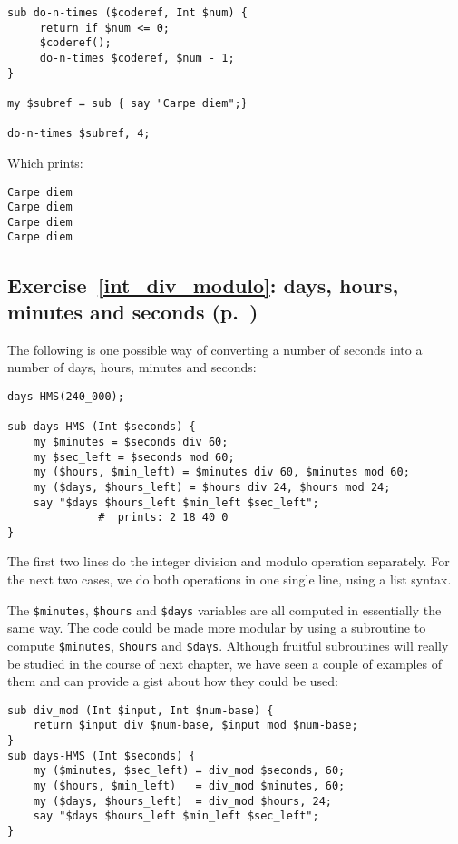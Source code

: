 \begin{verbatim}
sub do-n-times ($coderef, Int $num) {
     return if $num <= 0;
     $coderef();
     do-n-times $coderef, $num - 1;
}

my $subref = sub { say "Carpe diem";}

do-n-times $subref, 4;
\end{verbatim}

Which prints:

\begin{verbatim}
Carpe diem
Carpe diem
Carpe diem
Carpe diem
\end{verbatim}

\subsection{Exercise~\ref{int_div_modulo}: days, hours, 
minutes and seconds (p.~\pageref{int_div_modulo})}
\label{sol_int_div_modulo}

The following is one possible way of converting a number 
of seconds into a number of days, hours, minutes and seconds:


\begin{verbatim}
days-HMS(240_000);

sub days-HMS (Int $seconds) {
    my $minutes = $seconds div 60;
    my $sec_left = $seconds mod 60;
    my ($hours, $min_left) = $minutes div 60, $minutes mod 60;
    my ($days, $hours_left) = $hours div 24, $hours mod 24;
    say "$days $hours_left $min_left $sec_left"; 
              #  prints: 2 18 40 0
}
\end{verbatim}

The first two lines do the integer division and modulo 
operation separately. For the next two cases, we do both 
operations in one single line, using a list syntax.

The \verb'$minutes', \verb'$hours' and \verb'$days' variables 
are all computed in essentially the same way. The code could 
be made more modular by  using a subroutine to compute 
\verb'$minutes', \verb'$hours' and \verb'$days'. Although 
fruitful subroutines will really be studied in the course 
of next chapter, we have seen a couple of examples of 
them and can provide a gist about how they could be used:

\begin{verbatim}
sub div_mod (Int $input, Int $num-base) {
    return $input div $num-base, $input mod $num-base;
}
sub days-HMS (Int $seconds) {
    my ($minutes, $sec_left) = div_mod $seconds, 60;
    my ($hours, $min_left)   = div_mod $minutes, 60;
    my ($days, $hours_left)  = div_mod $hours, 24;
    say "$days $hours_left $min_left $sec_left"; 
}
\end{verbatim}

